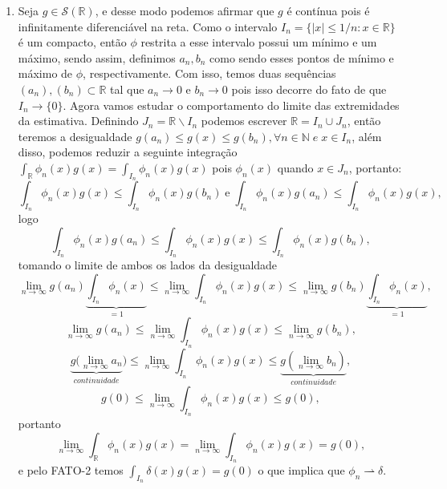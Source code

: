 \documentclass{article}
\begin{document}
\begin{enumerate}
\begin{enumerate}
					
				\item Seja $g \in \mathcal{S}(\mathbb{R})$, e desse modo 
				podemos afirmar que $g$ é contínua pois é infinitamente diferenciável na reta. Como o intervalo $I_{n} = \{|x| \leq 1/n: x \in \mathbb{R} \}$ é um compacto, então $\phi$ restrita a esse intervalo possui um mínimo e um máximo, sendo assim, definimos $a_{n}, b_{n}$ como sendo esses pontos de mínimo e máximo de $\phi$, respectivamente. Com isso, temos duas sequências $(a_{n}), (b_{n}) \subset \mathbb{R}$ tal que $a_{n} \to 0$ e $b_{n} \to 0$ pois isso decorre do fato de que $I_{n} \to \{0\}$. Agora vamos estudar o comportamento do limite das extremidades da estimativa. Definindo $J_{n} = \mathbb{R}\backslash I_{n}$ podemos escrever $\mathbb{R} = I_{n} \cup J_{n}$, então teremos a desigualdade $g(a_{n}) \leq g(x) \leq g(b_{n}), \forall n \in \mathbb{N} \; e \; x \in I_{n}$, além disso, podemos reduzir a seguinte integração $\int_{\mathbb{R}} \phi_{n}(x)g(x) = \int_{I_{n}} \phi_{n}(x)g(x)$ pois $\phi_{n}(x)$ quando $x \in J_{n}$, portanto:
				$$
				\int_{I_{n}} \phi_{n}(x) g(x) \leq \int_{I_{n}} \phi_{n}(x) g(b_{n}) \; \text{e} \;
				\int_{I_{n}} \phi_{n}(x) g(a_{n}) \leq \int_{I_{n}} \phi_{n}(x)g(x),
				$$
				logo
				$$
				\int_{I_{n}} \phi_{n}(x) g(a_{n}) 
				\leq \int_{I_{n}} \phi_{n}(x)g(x) \leq \int_{I_{n}} \phi_{n}(x) g(b_{n}),
				$$
				tomando o limite de ambos os lados da desigualdade
				$$
				\lim_{n\to \infty} g(a_{n}) \underbrace{ \int_{I_{n}} \phi_{n}(x) }_{=1}\leq \lim_{n\to \infty} \int_{I_{n}}\phi_{n}(x)g(x) \leq  \lim_{n\to \infty}  g(b_{n}) \underbrace{ \int_{I_{n}} \phi_{n}(x) }_{=1},
				$$
				$$
				\lim_{n\to \infty} g(a_{n}) \leq \lim_{n\to \infty} \int_{I_{n}}\phi_{n}(x)g(x) \leq  \lim_{n\to \infty}  g(b_{n}) ,
				$$
				$$
				\underbrace{ g(\lim_{n\to \infty} a_{n}}_{continuidade}) \leq \lim_{n\to \infty} \int_{I_{n}}\phi_{n}(x)g(x) \leq \underbrace{ g(\lim_{n\to \infty} b_{n}) }_{continuidade} ,
				$$
				$$
				g(0) \leq \lim_{n\to \infty} \int_{I_{n}}\phi_{n}(x)g(x) \leq  g(0) ,
				$$
				portanto
				$$
				 \lim_{n\to \infty} \int_{\mathbb{R}} \phi_{n}(x)g(x) = \lim_{n\to \infty} \int_{I_{n}}\phi_{n}(x)g(x) = g(0),
				$$
				e pelo FATO-2 temos $\int_{I_{n}}\delta(x)g(x) = g(0)$ o que implica que $\phi_{n} \rightharpoonup \delta$.
				
				
				

\end{enumerate}
\end{enumerate}
\end{document}
